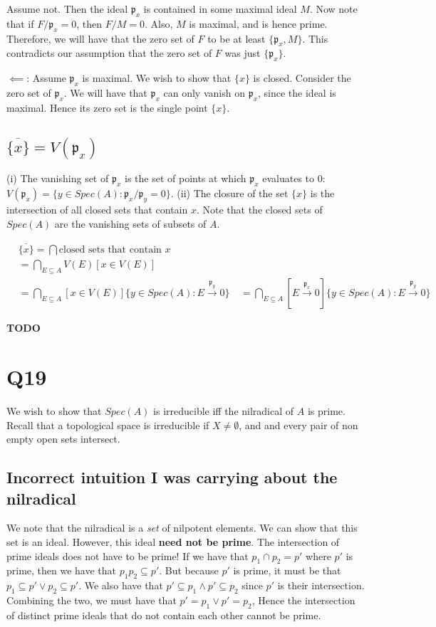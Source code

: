 \documentclass{book}
\newcommand{\frakp}{\ensuremath{\mathfrak{p}}}
\theoremstyle{definition}
\begin{document}
Assume not. Then the ideal $\frakp_x$ is contained in some maximal ideal $M$.
Now note that if $F / \frakp_x = 0$, then $F / M = 0$. Also, $M$ is maximal, and
is hence prime. Therefore, we will have that the zero set of $F$ to be
at least $\{ \frakp_x, M \}$. This contradicts our assumption that the
zero set of $F$ was just $\{ \frakp_x \}$.

$\impliedby$: Assume $\frakp_x$ is maximal. We wish to show that $\{ x \}$ is
closed.  Consider the zero set of $\frakp_x$. We will have that $\frakp_x$ can
only vanish on $\frakp_x$, since the ideal is maximal. Hence its zero set is
the single point $\{ x \}$.

\subsection{$\overline{\{ x \}} = V(\frakp_x)$}
(i) The vanishing set of $\frakp_x$ is the set of points at which
$\frakp_x$ evaluates to $0$: $V(\frakp_x) = \{ y \in Spec(A) : \frakp_x / \frakp_y = 0 \}$.
(ii) The closure of the set $\{x \}$ is the intersection of all closed sets that contain $x$.
Note that the closed sets of $Spec(A)$ are the vanishing sets of subsets of $A$.

\begin{align*}
    &\overline{\{ x \}} = \bigcap \text{closed sets that contain $x$} \\
    &= \bigcap_{E \subseteq A} V(E) [x \in V(E)] \\
    &=  \bigcap_{E\subseteq A} [x \in V(E)]  \{ y \in Spec(A): E \xrightarrow{\frakp_y} 0 \} \
    &=  \bigcap_{E\subseteq A} [E \xrightarrow{\frakp_x}  0]  \{ y \in Spec(A): E \xrightarrow{\frakp_y} 0 \}
\end{align*}

\textbf{TODO}

\section{Q19}
We wish to show that $Spec(A)$ is irreducible iff the nilradical of $A$ is prime.
Recall that a topological space is irreducible if $X \neq \emptyset$, and
and every pair of non empty open sets intersect.

\subsection{Incorrect intuition I was carrying about the nilradical}
We note that the nilradical is a \emph{set} of nilpotent elements. We can show
that this set is an ideal. However, this ideal \textbf{need not be prime}.
The intersection of prime ideals
does not have to be prime! If we have that $p_1 \cap p_2 = p'$ where $p'$ is
prime, then we have that $p_1 p_2 \subseteq p'$. But because $p'$ is prime,
it must be that $p_1 \subseteq p' \lor p_2 \subseteq p'$. We also
have that $p' \subseteq p_1 \land p' \subseteq p_2$ since $p'$ is their intersection.
Combining the two, we must have that $p' = p_1 \lor p' = p_2$, 
Hence the intersection of distinct prime ideals that do not contain each other
cannot be prime.
                                                                                    
\end{document}
